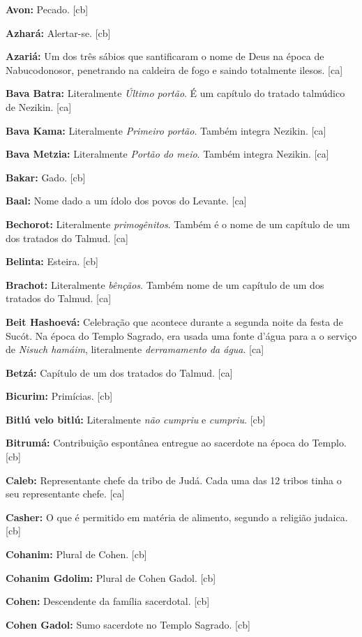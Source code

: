 \textbf{Avon:} Pecado. [cb]

\textbf{Azhará:} Alertar-se. [cb]

\textbf{Azariá:} Um dos três sábios que santificaram o nome de Deus na
época de Nabucodonosor, penetrando na caldeira de fogo e saindo
totalmente ilesos. [ca]

\textbf{Bava Batra:} Literalmente \emph{Último portão}. É um capítulo do tratado talmúdico de Nezikin. [ca]

\textbf{Bava Kama:} Literalmente \emph{Primeiro portão}. Também integra Nezikin. [ca]

\textbf{Bava Metzia:} Literalmente \emph{Portão do meio}. Também integra Nezikin. [ca]

\textbf{Bakar:} Gado. [cb]

\textbf{Baal:} Nome dado a um ídolo dos povos do Levante. [ca]

\textbf{Bechorot:} Literalmente \emph{primogênitos}. Também é o nome de um capítulo de um dos tratados do Talmud. [ca]

\textbf{Belinta:} Esteira. [cb]

\textbf{Brachot:} Literalmente \emph{bênçãos}. Também nome de um capítulo de um dos
tratados do Talmud. [ca]

\textbf{Beit Hashoevá:} Celebração que acontece durante a segunda noite da festa de Sucót. Na época do Templo Sagrado, era usada uma fonte d'água para a o serviço de \emph{Nisuch hamáim}, literalmente \emph{derramamento da água}. [ca]

\textbf{Betzá:} Capítulo de um dos tratados do Talmud. [ca]

\textbf{Bicurim:} Primícias. [cb]

\textbf{Bitlú velo bitlú:} Literalmente \emph{não cumpriu} e \emph{cumpriu}. [cb]

\textbf{Bitrumá:} Contribuição espontânea entregue ao sacerdote na
época do Templo. [cb]

\textbf{Caleb:} Representante chefe da tribo de Judá. Cada uma das 12
tribos tinha o seu representante chefe. [ca]

\textbf{Casher:} O que é permitido em matéria de alimento, segundo a
religião judaica. [cb]

\textbf{Cohanim:} Plural de Cohen. [cb]

\textbf{Cohanim Gdolim:} Plural de Cohen Gadol. [cb]

\textbf{Cohen:} Descendente da família sacerdotal. [cb]

\textbf{Cohen Gadol:} Sumo sacerdote no Templo Sagrado. [cb]

